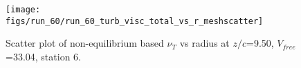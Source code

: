 \begin{figure}[H]
\centering
\texttt{[image: figs/run\_60/run\_60\_turb\_visc\_total\_vs\_r\_meshscatter]}
\caption{Scatter plot of non-equilibrium based $\nu_T$ vs radius at $z/c$=9.50, $V_{free}$=33.04, station 6.}
\label{fig:run_60_turb_visc_total_vs_r_meshscatter}
\end{figure}



